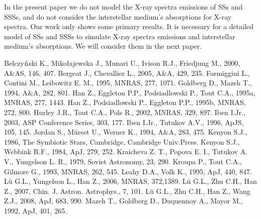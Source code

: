 \documentclass{elsart}
\begin{document}
In the present paper we do not model the X-ray spectra emissions of
SSs and SSSs, and do not consider the interstellar medium's
absorptions for X-ray spectra. Our work only shows some primary
results. It is necessary for a detailed model of SSs and SSSs to
simulate X-ray spectra emissions and interstellar medium's
absorptions. We will consider them in the next paper.

\begin{thebibliography}{}
Belczy$\rm \acute{n}$ski K., Miko{\l}ajewska J., Munari U., Ivison
R.J., Friedjung M., 2000, A\&AS, 146, 407.
Bergeat J., Chevallier L., 2005, A\&A, 429, 235.
Formiggini L., Contini M.,
Leibowitz E. M., 1995, MNRAS, 277, 1071.
Goldberg D., Mazeh T., 1994, A\&A, 282, 801.
Han Z., Eggleton P.P., Podsiadlowski P., Tout C.A., 1995a, MNRAS,
277, 1443.
Han Z., Podsiadlowski P., Eggleton P.P., 1995b, MNRAS, 272, 800.
Hurley J.R., Tout C.A., Pols R., 2002, MNRAS, 329, 897.
Iben I.Jr., 2003, ASP Conference Series, 303, 177.
Iben I.Jr., Tutukov A.V., 1996, ApJS, 105, 145.
Jordan S., M\"{u}rset U., Werner
K., 1994, A\&A, 283, 475.
Kenyon S.J., 1986, The Symbiotic Stars, Cambridge, Cambridge
Univ.Press.
Kenyon S.J., Webbink R.F., 1984, ApJ, 279, 252.
Kraicheva Z. T., Popova E.
I., Tutukov A. V., Yungelson L. R., 1979, Soviet Astronomy, 23, 290.
Kroupa P., Tout C.A., Gilmore G., 1993, MNRAS, 262, 545.
Leahy D.A., Volk K., 1995, ApJ, 440, 847.
L\"{u} G.L., Yungelson L., Han Z., 2006, MNRAS, 372,1389.
L\"{u} G.L., Zhu C.H., Han Z.,
2007, Chin. J. Astron. Astrophys., 7, 101.
L\"{u} G.L., Zhu C.H., Han Z., Wang Z.J., 2008, ApJ, 683, 990.
Mazeh T., Goldberg D., Duquennoy A., Mayor M., 1992, ApJ, 401, 265.

\end{thebibliography}
\end{document}
